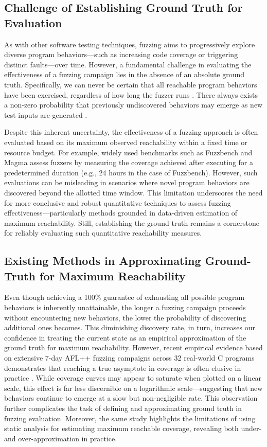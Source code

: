 \documentclass[conference]{IEEEtran}
\begin{document}
\subsection{Challenge of Establishing Ground Truth for Evaluation}

As with other software testing techniques, fuzzing aims to progressively explore diverse program behaviors—such as increasing code coverage or triggering distinct faults—over time. However, a fundamental challenge in evaluating the effectiveness of a fuzzing campaign lies in the absence of an absolute ground truth. Specifically, we can never be certain that all reachable program behaviors have been exercised, regardless of how long the fuzzer runs \cite{dijkstra2002ewd}. There always exists a non-zero probability that previously undiscovered behaviors may emerge as new test inputs are generated \cite{boehme2021residual}.

Despite this inherent uncertainty, the effectiveness of a fuzzing approach is often evaluated based on its maximum observed reachability within a fixed time or resource budget. For example, widely used benchmarks such as Fuzzbench \cite{metzman2021fuzzbench} and Magma \cite{hazimeh2020magma} assess fuzzers by measuring the coverage achieved after executing for a predetermined duration (e.g., 24 hours in the case of Fuzzbench). However, such evaluations can be misleading in scenarios where novel program behaviors are discovered beyond the allotted time window. This limitation underscores the need for more conclusive and robust quantitative techniques to assess fuzzing effectiveness—particularly methods grounded in data-driven estimation of maximum reachability. Still, establishing the ground truth remains a cornerstone for reliably evaluating such quantitative reachability measures.

\subsection{Existing Methods in Approximating Ground-Truth for Maximum Reachability}

Even though achieving a 100\% guarantee of exhausting all possible program behaviors is inherently unattainable, the longer a fuzzing campaign proceeds without encountering new behaviors, the lower the probability of discovering additional ones becomes. This diminishing discovery rate, in turn, increases our confidence in treating the current state as an empirical approximation of the ground truth for maximum reachability. However, recent empirical evidence based on extensive 7-day AFL++ \cite{fioraldi2020AFL++} fuzzing campaigns across 32 real-world C programs demonstrates that reaching a true asymptote in coverage is often elusive in practice \cite{liyanage2023reachable}. While coverage curves may appear to saturate when plotted on a linear scale, this effect is far less discernible on a logarithmic scale—suggesting that new behaviors continue to emerge at a slow but non-negligible rate. This observation further complicates the task of defining and approximating ground truth in fuzzing evaluation. Moreover, the same study highlights the limitations of using static analysis for estimating maximum reachable coverage, revealing both under- and over-approximation in practice. 
\end{document}
